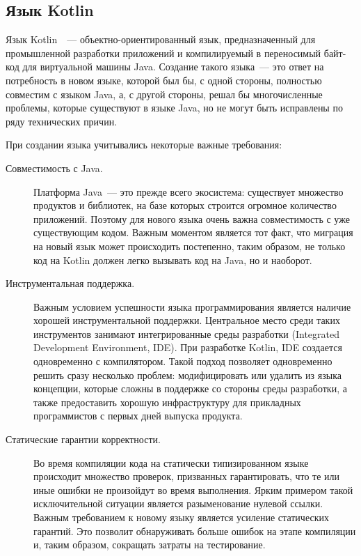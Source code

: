 \subsection{Язык Kotlin}\label{kotlin-desc}
Язык Kotlin~\cite{breslav2011}~--- объектно-ориентированный язык, предназначенный для промышленной разработки приложений и компилируемый в переносимый байт-код для виртуальной машины Java. Создание такого языка~--- это ответ на потребность в новом языке, которой был бы, с одной стороны, полностью совместим с языком Java, а, с другой стороны, решал бы многочисленные проблемы, которые существуют в языке Java, но не могут быть исправлены по ряду технических причин.

При создании языка учитывались некоторые важные требования: %
\begin{description}
	\item[Совместимость с Java.] Платформа Java~--- это прежде всего экосистема: существует множество продуктов и библиотек, на базе которых строится огромное количество приложений.
	Поэтому для нового языка очень важна совместимость с уже существующим кодом. Важным моментом является тот факт, что миграция на новый язык может происходить постепенно, таким образом, не только код на Kotlin должен легко вызывать код на Java, но и наоборот.

	\item[Инструментальная поддержка.] Важным условием успешности языка программирования является наличие хорошей инструментальной поддержки. Центральное место среди таких инструментов занимают интегрированные среды разработки (Integrated Development Environment, IDE).
	При разработке Kotlin, IDE создается одновременно с компилятором. Такой подход позволяет одновременно решить сразу несколько проблем: модифицировать или удалить из языка концепции, которые сложны в поддержке со стороны среды разработки, а также предоставить хорошую инфраструктуру для прикладных программистов с первых дней выпуска продукта.

	\item[Статические гарантии корректности.] Во время компиляции кода на статически типизированном языке происходит множество проверок, призванных гарантировать, что те или иные ошибки не произойдут во время выполнения.
	 Ярким примером такой исключительной ситуации является разыменование нулевой ссылки. Важным требованием к новому языку является усиление статических гарантий. Это позволит обнаруживать больше ошибок на этапе компиляции и, таким образом, сокращать затраты на тестирование.


\end{description}
